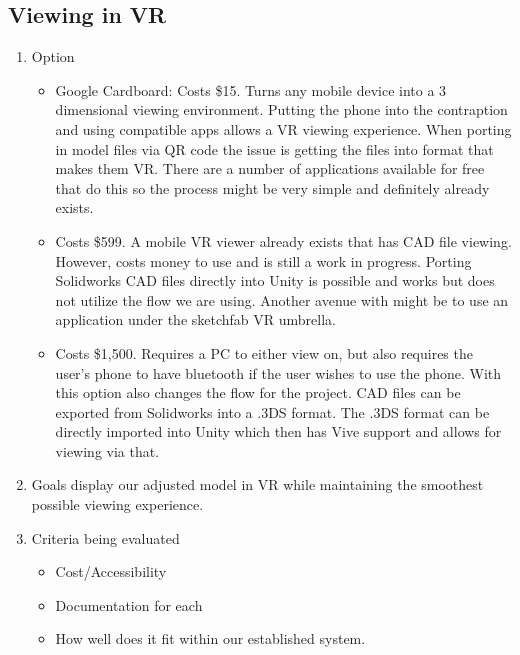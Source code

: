 \documentclass[letterpaper, 10pt, draftclsnofoot, compsoc, onecolumn]{IEEEtran}
\begin{document}
	\subsection{Viewing in VR}
		\begin{enumerate}
			\item{Option}
				\begin{itemize}
					\item
					Google Cardboard: Costs \$15. Turns any mobile device into a 3 dimensional viewing environment. Putting the phone into the contraption and using compatible apps allows a VR viewing experience. When porting in model files via QR code the issue is getting the files into format that makes them VR. There are a number of applications available for free that do this so the process might be very simple and definitely already exists.
					\item
					Costs \$599. A mobile VR viewer already exists that has CAD file viewing. However, costs money to use and is still a work in progress. Porting Solidworks CAD files directly into Unity is possible and works but does not utilize the flow we are using. Another avenue with might be to use an application under the sketchfab VR umbrella.
					\item	
					Costs \$1,500. Requires a PC to either view on, but also requires the user's phone to have bluetooth if the user wishes to use the phone. With this option also changes the flow for the project. CAD files can be exported from Solidworks into a .3DS format. The .3DS format can be directly imported into Unity which then has Vive support and allows for viewing via that. 
				\end{itemize}
			\item{Goals} display our adjusted model in VR while maintaining the smoothest possible viewing experience.
			\item{Criteria being evaluated}
				\begin{itemize}
					\item
					Cost/Accessibility
					\item	
					Documentation for each
					\item	
					How well does it fit within our established system.					
				\end{itemize}

\end{enumerate}
\end{document}
